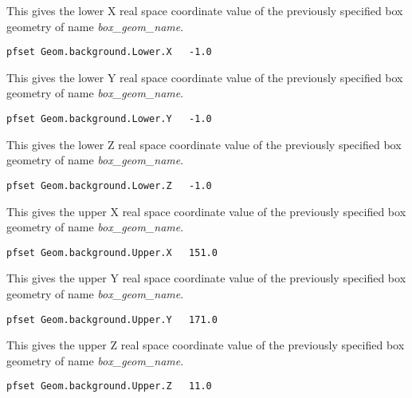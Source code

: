 {This gives the lower X real space coordinate value
of the previously specified box geometry of name {\em box\_geom\_name}.}
\begin{display}\begin{verbatim}
pfset Geom.background.Lower.X   -1.0
\end{verbatim}\end{display}

{This gives the lower Y real space coordinate value
of the previously specified box geometry of name {\em box\_geom\_name}.}
\begin{display}\begin{verbatim}
pfset Geom.background.Lower.Y   -1.0
\end{verbatim}\end{display}

{This gives the lower Z real space coordinate value
of the previously specified box geometry of name {\em box\_geom\_name}.}
\begin{display}\begin{verbatim}
pfset Geom.background.Lower.Z   -1.0
\end{verbatim}\end{display}

{This gives the upper X real space coordinate value
of the previously specified box geometry of name {\em box\_geom\_name}.}
\begin{display}\begin{verbatim}
pfset Geom.background.Upper.X   151.0
\end{verbatim}\end{display}

{This gives the upper Y real space coordinate value
of the previously specified box geometry of name {\em box\_geom\_name}.}
\begin{display}\begin{verbatim}
pfset Geom.background.Upper.Y   171.0
\end{verbatim}\end{display}

{This gives the upper Z real space coordinate value
of the previously specified box geometry of name {\em box\_geom\_name}.}
\begin{display}\begin{verbatim}
pfset Geom.background.Upper.Z   11.0
\end{verbatim}\end{display}

